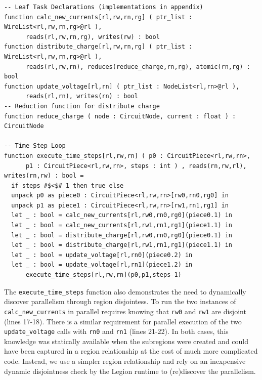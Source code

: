 \begin{lstlisting}[float={t},label={lst:loop},caption={Main Simulation Loop}]
-- Leaf Task Declarations (implementations in appendix)
function calc_new_currents[rl,rw,rn,rg] ( ptr_list : WireList<rl,rw,rn,rg>@rl ), 
      reads(rl,rw,rn,rg), writes(rw) : bool
function distribute_charge[rl,rw,rn,rg] ( ptr_list : WireList<rl,rw,rn,rg>@rl ), 
      reads(rl,rw,rn), reduces(reduce_charge,rn,rg), atomic(rn,rg) : bool 
function update_voltage[rl,rn] ( ptr_list : NodeList<rl,rn>@rl ), 
      reads(rl,rn), writes(rn) : bool
-- Reduction function for distribute charge
function reduce_charge ( node : CircuitNode, current : float ) : CircuitNode

-- Time Step Loop
function execute_time_steps[rl,rw,rn] ( p0 : CircuitPiece<rl,rw,rn>, 
      p1 : CircuitPiece<rl,rw,rn>, steps : int ) , reads(rn,rw,rl), writes(rn,rw) : bool = 
  if steps #$<$# 1 then true else
  unpack p0 as piece0 : CircuitPiece<rl,rw,rn>[rw0,rn0,rg0] in 
  unpack p1 as piece1 : CircuitPiece<rl,rw,rn>[rw1,rn1,rg1] in
  let _ : bool = calc_new_currents[rl,rw0,rn0,rg0](piece0.1) in
  let _ : bool = calc_new_currents[rl,rw1,rn1,rg1](piece1.1) in
  let _ : bool = distribute_charge[rl,rw0,rn0,rg0](piece0.1) in
  let _ : bool = distribute_charge[rl,rw1,rn1,rg1](piece1.1) in
  let _ : bool = update_voltage[rl,rn0](piece0.2) in
  let _ : bool = update_voltage[rl,rn1](piece1.2) in
      execute_time_steps[rl,rw,rn](p0,p1,steps-1)
\end{lstlisting}

The {\tt execute\_time\_steps} function also demonstrates the need to 
dynamically discover parallelism through region disjointess.  
To run the two instances of 
{\tt calc\_new\_currents} in parallel requires knowing that {\tt rw0}
and {\tt rw1} are disjoint (lines 17-18).  There is a similar requirement for parallel
execution of the two {\tt update\_voltage} calls with {\tt rn0} and {\tt rn1} (lines 21-22).  In
both cases, this knowledge was statically available when the subregions were created 
and could have been captured in a region relationship at the cost
of much more complicated code.  Instead, we use a simpler region relationship
and rely on an inexpensive dynamic disjointness
check by the Legion runtime to (re)discover the parallelism.

